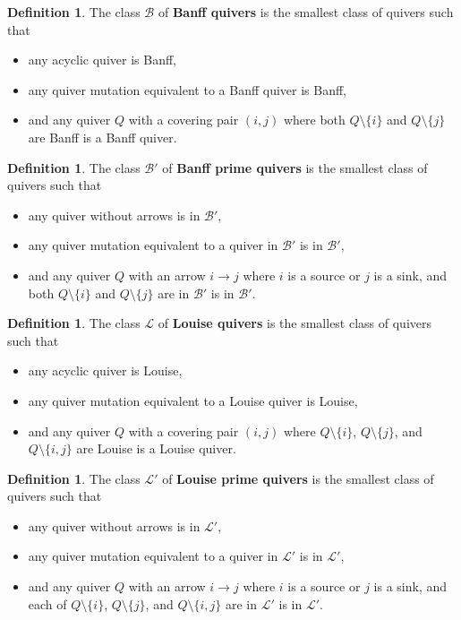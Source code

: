 \documentclass[10pt]{amsart}
\theoremstyle{definition}
\newtheorem{defi}[thm]{Definition}
\theoremstyle{remark}
\newcommand{\BB}{\mathcal{B}}
\newcommand{\LL}{\mathcal{L}}
\begin{document}
\begin{defi}\label{def-banff}
    The class $\BB$ of \textbf{Banff quivers} is the smallest class of quivers such that 
    \begin{itemize}
        \item any acyclic quiver is Banff,
        \item any quiver mutation equivalent to a Banff quiver is Banff, 
        \item and any quiver $Q$ with a covering pair $(i,j)$ where both $Q\setminus \{i\}$ and $Q\setminus \{j\}$ are Banff is a Banff quiver.
    \end{itemize}
 \end{defi}

 \begin{defi}\label{def-banffprime}
    The class $\BB'$ of \textbf{Banff prime quivers} is the smallest class of quivers such that
    \begin{itemize}
        \item any quiver without arrows is in $\BB'$,
        \item any quiver mutation equivalent to a quiver in $\BB'$ is in $\BB'$, 
        \item and any quiver $Q$ with an arrow $i \to j$ where $i$ is a source or $j$ is a sink, and both $Q\setminus \{i\}$ and $Q\setminus \{j\}$ are in $\BB'$ is in $\BB'$.
    \end{itemize}
 \end{defi}

 \begin{defi}\label{def-louise}
    The class $\LL$ of \textbf{Louise quivers} is the smallest class of quivers such that 
    \begin{itemize}
        \item any acyclic quiver is Louise,
        \item any quiver mutation equivalent to a Louise quiver is Louise, 
        \item and any quiver $Q$ with a covering pair $(i,j)$ where $Q\setminus \{i\}$, $Q\setminus \{j\}$, and $Q\setminus \{i,j\}$ are Louise is a Louise quiver.
    \end{itemize}
 \end{defi}

 \begin{defi}\label{def-louiseprime}
    The class $\LL'$ of \textbf{Louise prime quivers} is the smallest class of quivers such that 
    \begin{itemize}
        \item any quiver without arrows is in $\LL'$,
        \item any quiver mutation equivalent to a quiver in $\LL'$ is in $\LL'$, 
        \item and any quiver $Q$ with an arrow $i \to j$ where $i$ is a source or $j$ is a sink, and each of $Q\setminus \{i\}$, $Q\setminus \{j\}$, and $Q\setminus \{i,j\}$ are in $\LL'$ is in $\LL'$.
    \end{itemize}
 \end{defi}
\end{document}
